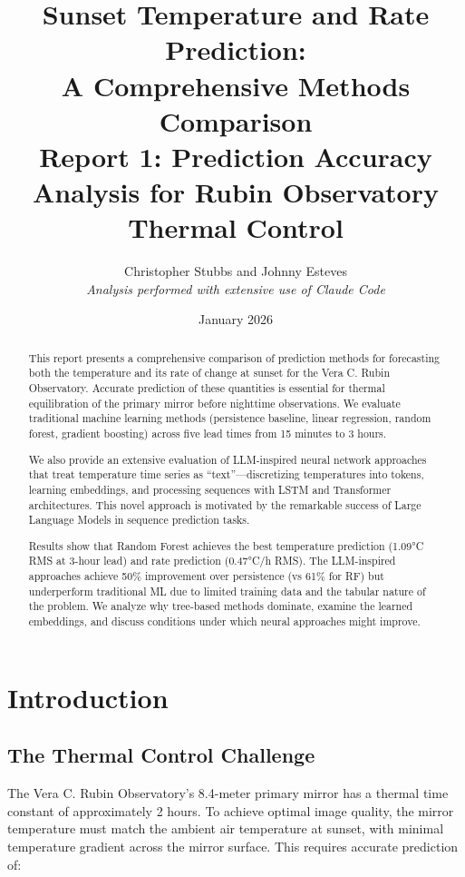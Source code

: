 \documentclass[11pt,letterpaper]{article}
\title{\textbf{Sunset Temperature and Rate Prediction:\\A Comprehensive Methods Comparison}\\[0.5em]
\large Report 1: Prediction Accuracy Analysis for Rubin Observatory Thermal Control}
\author{Christopher Stubbs and Johnny Esteves\\[0.5em]
\small\textit{Analysis performed with extensive use of Claude Code}}
\date{January 2026}
\begin{document}
\maketitle

\begin{abstract}
This report presents a comprehensive comparison of prediction methods for forecasting both the temperature and its rate of change at sunset for the Vera C. Rubin Observatory. Accurate prediction of these quantities is essential for thermal equilibration of the primary mirror before nighttime observations. We evaluate traditional machine learning methods (persistence baseline, linear regression, random forest, gradient boosting) across five lead times from 15 minutes to 3 hours.

We also provide an extensive evaluation of LLM-inspired neural network approaches that treat temperature time series as ``text''---discretizing temperatures into tokens, learning embeddings, and processing sequences with LSTM and Transformer architectures. This novel approach is motivated by the remarkable success of Large Language Models in sequence prediction tasks.

Results show that Random Forest achieves the best temperature prediction (1.09°C RMS at 3-hour lead) and rate prediction (0.47°C/h RMS). The LLM-inspired approaches achieve 50\% improvement over persistence (vs 61\% for RF) but underperform traditional ML due to limited training data and the tabular nature of the problem. We analyze why tree-based methods dominate, examine the learned embeddings, and discuss conditions under which neural approaches might improve.
\end{abstract}

\tableofcontents

\newpage

\section{Introduction}

\subsection{The Thermal Control Challenge}

The Vera C. Rubin Observatory's 8.4-meter primary mirror has a thermal time constant of approximately 2 hours. To achieve optimal image quality, the mirror temperature must match the ambient air temperature at sunset, with minimal temperature gradient across the mirror surface. This requires accurate prediction of:
\end{document}
